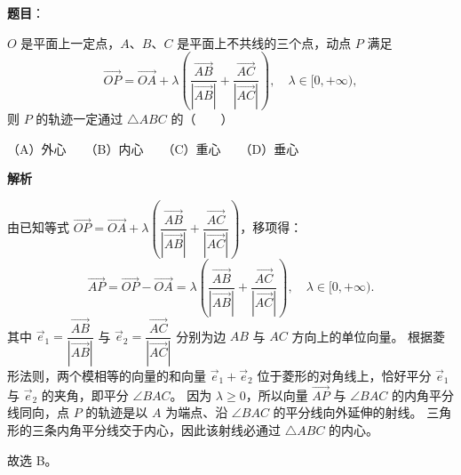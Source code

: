 \begin{answer}

\textbf{题目}：

$O$ 是平面上一定点，$A$、$B$、$C$ 是平面上不共线的三个点，动点 $P$ 满足
\nopagebreak[4]
\[\vec{OP} = \vec{OA} + \lambda \left(\frac{\vec{AB}}{|\vec{AB}|} + \frac{\vec{AC}}{|\vec{AC}|}\right), \quad \lambda \in [0, +\infty),\]
则 $P$ 的轨迹一定通过 $\triangle ABC$ 的\mbox{（　　）}

（A）外心　　（B）内心　　（C）重心　　（D）垂心

\textbf{解析}

由已知等式 $\vec{OP} = \vec{OA} + \lambda \left(\dfrac{\vec{AB}}{|\vec{AB}|} + \dfrac{\vec{AC}}{|\vec{AC}|}\right)$，移项得：
\nopagebreak[4]
\[\vec{AP} = \vec{OP} - \vec{OA} = \lambda \left(\frac{\vec{AB}}{|\vec{AB}|} + \frac{\vec{AC}}{|\vec{AC}|}\right), \quad \lambda \in [0, +\infty).\]
其中 $\vec{e}_1 = \dfrac{\vec{AB}}{|\vec{AB}|}$ 与 $\vec{e}_2 = \dfrac{\vec{AC}}{|\vec{AC}|}$ 分别为边 $AB$ 与 $AC$ 方向上的单位向量。
根据菱形法则，两个模相等的向量的和向量 $\vec{e}_1 + \vec{e}_2$ 位于菱形的对角线上，恰好平分 $\vec{e}_1$ 与 $\vec{e}_2$ 的夹角，即平分 $\angle BAC$。
因为 $\lambda \ge 0$，所以向量 $\vec{AP}$ 与 $\angle BAC$ 的内角平分线同向，点 $P$ 的轨迹是以 $A$ 为端点、沿 $\angle BAC$ 的平分线向外延伸的射线。
三角形的三条内角平分线交于内心，因此该射线必通过 $\triangle ABC$ 的内心。

故选 B。


\end{answer}

